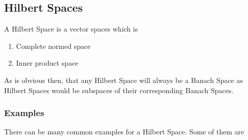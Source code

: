 \documentclass[a4paper,12pt]{article}
\begin{document}
	\subsection{Hilbert Spaces}
	A Hilbert Space is a vector spaces which is
		\begin{enumerate}
			\item Complete normed space
			\item Inner product space
		\end{enumerate}
	As is obvious then, that any Hilbert Space will always be a Banach Space as Hilbert Spaces would be subspaces of their corresponding Banach Spaces.
		\subsubsection{Examples} There can be many common examples for a Hilbert Space. Some of them are
\end{document}
